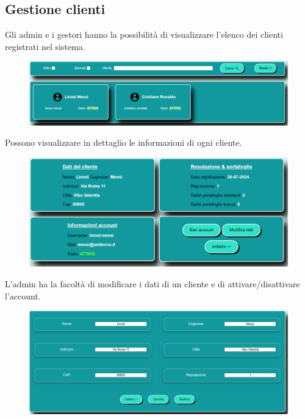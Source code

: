 \documentclass[a4paper, 14pt]{article}
\begin{document}
\begin{flushleft}
			\subsection{Gestione clienti}
				Gli admin e i gestori hanno la possibilità di visualizzare l'elenco dei clienti registrati nel sistema.
				\begin{figure}[H]
					\centering
					\includegraphics[width=\textwidth, frame=2pt]{"screenClienti.png"}	
				\end{figure}
				Possono visualizzare in dettaglio le informazioni di ogni cliente.
				\begin{figure}[H]
					\centering
					\includegraphics[width=\textwidth, frame=2pt]{"screenDettaglioCliente.png"}	
				\end{figure}
				L'admin ha la facoltà di modificare i dati di un cliente e di attivare/disattivare l'account.	
				\begin{figure}[H]
					\centering
					\includegraphics[width=\textwidth, frame=2pt]{"screenModificaCliente.png"}	
				\end{figure}

\end{flushleft}
\end{document}
